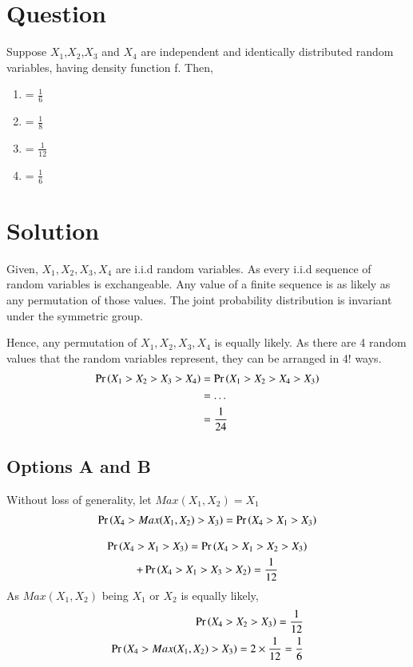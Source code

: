 \documentclass[journal,12pt,twocolumn]{IEEEtran}
\theoremstyle{definition}
\begin{document}
\section*{Question}
Suppose $X_1$,$X_2$,$X_3$ and $X_4$ are independent and identically distributed random variables, having density function f. Then,
\begin{enumerate}[label=\Alph*)]
\item {} = $\frac{1}{6}$
\item {} = $\frac{1}{8}$
\item {} = $\frac{1}{12}$
\item {} = $\frac{1}{6}$
\end{enumerate}

\section*{Solution}
Given, $X_1,X_2,X_3,X_4$ are i.i.d random variables.
As every i.i.d sequence of random variables is exchangeable. 
Any value of a finite sequence is as likely as any permutation of those values. The joint probability distribution is invariant under the symmetric group.

Hence, any permutation of $X_1,X_2,X_3,X_4$ is equally likely.
As there are 4 random values that the random variables represent, they can be arranged in 4! ways. 
\begin{align}
   \Pr\left(X_1>X_2>X_3>X_4\right) &= \Pr\left(X_1>X_2>X_4>X_3\right) \\&= \dots\\ &= \frac{1}{24}
\end{align}


\subsection*{\textbf{Options A and B}}
Without loss of generality, let $Max(X_1,X_2) = X_1$
\begin{align}
    \Pr\left(X_4 > Max(X_1,X_2) > X_3\right) = \Pr\left(X_4 > X_1 > X_3\right) 
\end{align}

\begin{multline}
    \Pr\left(X_4 > X_1 > X_3\right) = \Pr\left(X_4 > X_1 > X_2> X_3\right) \\+\Pr\left(X_4 > X_1 > X_3 > X_2\right)
= \frac{1}{12}
\end{multline}
As $Max(X_1,X_2)$ being $X_1$ or $X_2$ is equally likely,
\begin{align}
\Pr\left(X_4 > X_2 > X_3\right) = \frac{1}{12}\\
\Pr\left(X_4 > Max(X_1,X_2) > X_3\right) = 2 \times \frac{1}{12} = \frac{1}{6}
\end{align}
\end{document}
